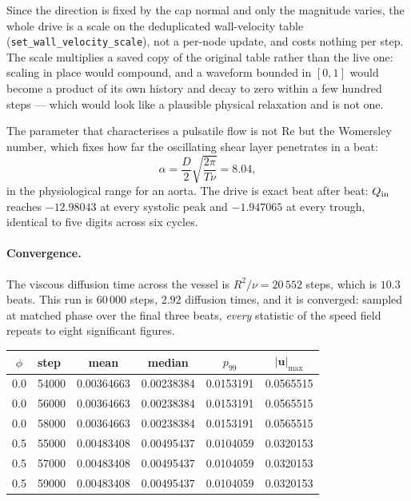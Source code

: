 \documentclass[11pt,a4paper]{article}
\newcommand{\code}[1]{\texttt{\small #1}}
\newcommand{\uu}{\bm{u}}
\begin{document}
Since the direction is fixed by the cap normal and only the magnitude varies, the
whole drive is a scale on the deduplicated wall-velocity table
(\code{set\_wall\_velocity\_scale}), not a per-node update, and costs nothing per
step. The scale multiplies a saved copy of the original table rather than the
live one: scaling in place would compound, and a waveform bounded in $[0,1]$
would become a product of its own history and decay to zero within a few hundred
steps --- which would look like a plausible physical relaxation and is not one.

The parameter that characterises a pulsatile flow is not $\mathrm{Re}$ but the
Womersley number, which fixes how far the oscillating shear layer penetrates in a
beat:
\begin{equation}
  \alpha = \frac{D}{2}\sqrt{\frac{2\pi}{T\nu}} = 8.04 ,
  \label{eq:womersley}
\end{equation}
in the physiological range for an aorta. The drive is exact beat after beat:
$Q_{\rm in}$ reaches $-12.98043$ at every systolic peak and $-1.947065$ at every
trough, identical to five digits across six cycles.

\paragraph{Convergence.} The viscous diffusion time across the vessel is
$R^2/\nu = 20\,552$ steps, which is $10.3$ beats. This run is $60\,000$ steps,
$2.92$ diffusion times, and it is converged: sampled at matched phase over the
final three beats, \emph{every} statistic of the speed field repeats to eight
significant figures.

\begin{center}\small
\begin{tabular}{clcccc}
\hline
$\phi$ & step & mean & median & $p_{99}$ & $|\uu|_{\max}$ \\
\hline
0.0 & 54000 & 0.00364663 & 0.00238384 & 0.0153191 & 0.0565515 \\
0.0 & 56000 & 0.00364663 & 0.00238384 & 0.0153191 & 0.0565515 \\
0.0 & 58000 & 0.00364663 & 0.00238384 & 0.0153191 & 0.0565515 \\
0.5 & 55000 & 0.00483408 & 0.00495437 & 0.0104059 & 0.0320153 \\
0.5 & 57000 & 0.00483408 & 0.00495437 & 0.0104059 & 0.0320153 \\
0.5 & 59000 & 0.00483408 & 0.00495437 & 0.0104059 & 0.0320153 \\
\hline
\end{tabular}
\end{center}
\end{document}
